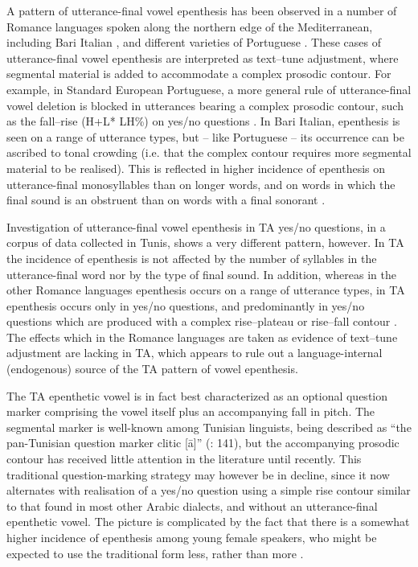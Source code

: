 \documentclass[output=paper]{langsci/langscibook}
\begin{document}
A pattern of utterance-final vowel epenthesis has been observed in a number of Romance languages spoken along the northern edge of the Mediterranean, including Bari Italian \citep{GriceEtAl2015}, and different varieties of Portuguese \citep{FrotaEtAl2015}. These cases of utterance-final vowel epenthesis are interpreted as text--tune adjustment, where segmental material is added to accommodate a complex prosodic contour.  For example, in Standard European Portuguese, a more general rule of utterance-final vowel deletion is blocked in utterances bearing a complex prosodic contour, such as the fall--rise (H+L* LH\%) on yes/no questions \citep{FrotaEtAl2015}. In Bari Italian, epenthesis is seen on a range of utterance types, but – like Portuguese – its occurrence can be ascribed to tonal crowding (i.e. that the complex contour requires more segmental material to be realised). This is reflected in higher incidence of epenthesis on utterance-final monosyllables than on longer words, and on words in which the final sound is an obstruent than on words with a final sonorant \citep{GriceEtAl2015}.

Investigation of utterance-final vowel epenthesis in TA yes/no questions, in a corpus of data collected in Tunis, shows a very different pattern, however. In TA the incidence of epenthesis is not affected by the number of syllables in the utterance-final word nor by the type of final sound. In addition, whereas in the other Romance languages epenthesis occurs on a range of utterance types, in TA epenthesis occurs only in yes/no questions, and predominantly in yes/no questions which are produced with a complex rise--plateau or rise--fall contour \citep{Hellmuthforthcomingtunisianyesno}. The effects which in the Romance languages are taken as evidence of text--tune adjustment are lacking in TA, which appears to rule out a language-internal (endogenous) source of the TA pattern of vowel epenthesis.

The TA epenthetic vowel is in fact best characterized as an optional question marker comprising the vowel itself plus an accompanying fall in pitch. The segmental marker is well-known among Tunisian linguists, being described as “the pan-Tunisian question marker clitic [ā]” (\citealt{HerinZammit2017}: 141), but the accompanying prosodic contour has received little attention in the literature until recently. This traditional question-marking strategy may however be in decline, since it now alternates with realisation of a yes/no question using a simple rise contour similar to that found in most other Arabic dialects, and without an utterance-final epenthetic vowel. The picture is complicated by the fact that there is a somewhat higher incidence of epenthesis among young female speakers, who might be expected to use the traditional form less, rather than more \citep{Hellmuthforthcomingtunisianyesno}. 
\end{document}

